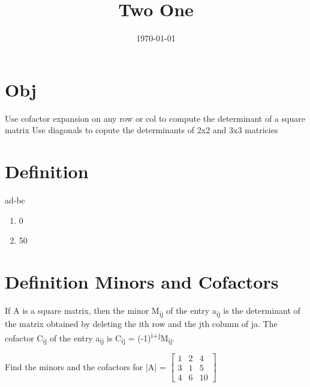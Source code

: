 \documentclass[11pt]{article}
\date{\today}
\title{Two One}
\begin{document}
\maketitle
\tableofcontents

\section{Obj}
\label{sec:org080f6e8}
Use cofactor expansion on any row or col to compute the determinant of a square matrix
Use diagonals to copute the determinants of 2x2 and 3x3 matricies
\section{Definition}
\label{sec:org2e55c5a}
ad-bc

\begin{enumerate}
\item 0
\item 50
\end{enumerate}
\section{Definition Minors and Cofactors}
\label{sec:org10596e3}
If A is a square matrix, then the minor M\textsubscript{ij} of the entry a\textsubscript{ij} is the determinant of the matrix obtained by deleting the ith row and the jth column of ja. The cofactor C\textsubscript{ij} of the entry a\textsubscript{ij} is C\textsubscript{ij} = (-1)\textsuperscript{i+j}M\textsubscript{ij}.

Find the minors and the cofactors for |A| = \(\begin{bmatrix}1&2&4\\3&1&5\\4&6&10\end{bmatrix}\)
\end{document}
